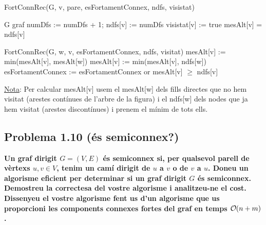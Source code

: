 \documentclass[a4paper,12pt]{article}
\DeclareRobustCommand{\bigO}{%
  \text{\usefont{OMS}{cmsy}{m}{n}O}%
}
\begin{document}
\begin{algorithm}[H]
    \caption{FortConnRec(G, v, pare, esFortamentConnex, ndfs, visistat)}
    \begin{algorithmic}[1]  %
        \Require G graf
        \State numDfs := numDfs + 1; ndfs[v] := numDfs
        \State visistat[v] := true
        \State mesAlt[v] = ndfs[v]

        \State
        
                \State FortConnRec(G, w, v, esFortamentConnex, ndfs, visitat)
                \State mesAlt[v] := min(mesAlt[v], mesAlt[w])
            \Else
                \State mesAlt[v] := min(mesAlt[v], ndfs[w])
            \EndIf
        \EndFor
        \State
            \State  esFortamentConnex := esFortamentConnex or mesAlt[v] $\geq$ ndfs[v]
        \EndIf
    \end{algorithmic}
\end{algorithm}

\underline{Nota}: Per calcular mesAlt[v] usem el mesAlt[w] dels fills directes que no hem visitat (arestes contínues de l'arbre de la figura) i el ndfs[w] dels nodes que ja hem visitat (arestes discontínues) i prenem el mínim de tots ells.

\subsection*{Problema 1.10 (és semiconnex?)}
\textbf{Un graf dirigit $G = (V, E)$ és semiconnex si, per qualsevol parell de vèrtexs $u, v \in V$, tenim un camí dirigit de $u$ a $v$ o de $v$ a $u$.
Doneu un algorisme eficient per determinar si un graf dirigit $G$ és semiconnex. Demostreu la correctesa del vostre algorisme i analitzeu-ne el cost. Dissenyeu el vostre algorisme fent us d'un algorisme que us proporcioni les components connexes fortes del graf en temps $\bigO(n + m)$.}

\newpage
\end{document}
